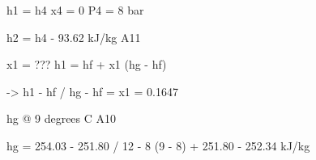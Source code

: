 h1 = h4 x4 = 0 P4 = 8 bar

h2 = h4 - 93.62 kJ/kg A11

x1 = ??? h1 = hf + x1 (hg - hf)

-> h1 - hf / hg - hf = x1 = 0.1647

hg @ 9 degrees C A10

hg = 254.03 - 251.80 / 12 - 8 (9 - 8) + 251.80 - 252.34 kJ/kg